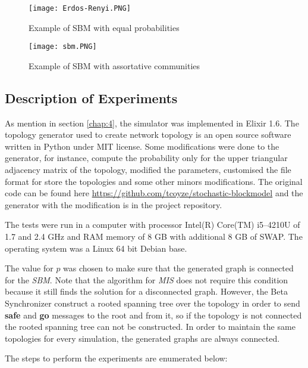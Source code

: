 \begin{figure}[ht]
\centering
\texttt{[image: Erdos-Renyi.PNG]} 
\caption{Example of SBM with equal probabilities}
\label{fig:erdos}
\end{figure}

\begin{figure}[ht]
\centering
\texttt{[image: sbm.PNG]} 
\caption{Example of SBM with assortative communities}
\label{fig:sbm}
\end{figure}

\subsection{Description of Experiments}

As mention in section \ref{chap:4}, the simulator was implemented in Elixir 1.6. The topology generator used to create network topology is an open source software written in Python under MIT license. Some modifications were done to the generator, for instance, compute the probability only for the upper triangular adjacency matrix of the topology, modified the parameters, customised the file format for store the topologies and some other minors modifications. The original code can be found here \url{https://github.com/tcoyze/stochastic-blockmodel} and the generator with the modification is in the project repository.

The tests were run in a computer with processor Intel(R) Core(TM) i5--4210U of 1.7 and 2.4 GHz and RAM memory of 8 GB with additional 8 GB of SWAP. The operating system was a Linux 64 bit Debian base.


The value for $p$ was chosen to make sure that the generated graph is connected for the \textit{SBM}. Note that the algorithm for \textit{MIS} does not require this condition because it still finds the solution for a disconnected graph. However, the Beta Synchronizer construct a rooted spanning tree over the topology in order to send \textbf{safe} and \textbf{go} messages to the root and from it, so if the topology is not connected the rooted spanning tree can not be constructed. In order to maintain the same topologies for every simulation, the generated graphs are always connected.  

The steps to perform the experiments are enumerated below:

